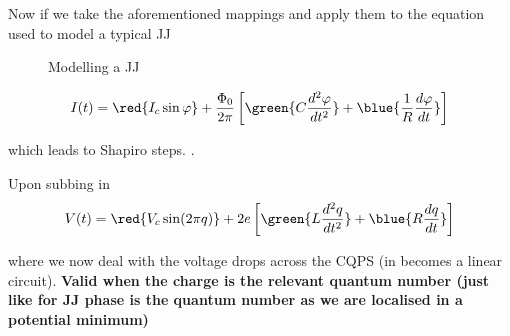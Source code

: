 Now  if we  take  the  aforementioned mappings  and  apply  them to  the
equation used to model a typical JJ

\begin{figure}[h]
  \centering {}
  \caption{\small Modelling a JJ\label{fig:typical_jj_setup}}
\end{figure}

\begin{equation}
  I(t) = \red{I_c\sin\varphi} + \frac{\Phi_{0}}{2\pi}\left[ \green{C \frac{d^2\varphi}{dt^{2}}} + \blue{\frac{1}{R}\frac{d\varphi}{dt}} \right]
\end{equation}

\noindent  which  leads  to  Shapiro steps.  .

Upon subbing in
\begin{equation}
  V(t) = \red{V_c\sin(2\pi q)} + 2e\left[ \green{L \frac{d^2q}{dt^{2}}} + \blue{R\frac{dq}{dt}} \right]
\end{equation}

\noindent where we  now deal with the voltage drops  across the CQPS (in
becomes a linear circuit). \textbf{Valid when the charge is the relevant
  quantum number (just like for JJ phase is the quantum number as we are
  localised in a potential minimum)}


\newpage

